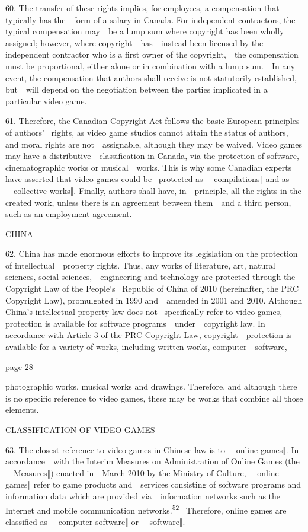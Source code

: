\documentclass[
]{article}
\begin{document}
{60. }{The transfer of these rights implies, for employees, a
compensation that typically has the~~form of a salary in Canada. For
independent contractors, the typical compensation may~~be a lump sum
where copyright has been wholly assigned; however, where
copyright~~has~~instead been licensed by the independent contractor who
is a first owner of the copyright,~~the compensation must be
proportional, either alone or in combination with a lump sum.~~In any
event, the compensation that authors shall receive is not statutorily
established, but~~will depend on the negotiation between the parties
implicated in a particular video game.}

{61. }{Therefore, the Canadian }{Copyright Act }{follows the basic
European princip}{les of authors' }{~rights, as video game studios
cannot attain the status of authors, and moral rights are
not~~assignable, although they may be waived. Video games may have a
distributive~~classification in Canada, via the protection of software,
cinematographic works or musical~~works. This is why some Canadian
experts have asserted that video games could be }{~protected as
―compilations‖ and as ―collective works‖}{. Finally, authors shall have,
in~~principle, all the rights in the created work, unless there is an
agreement between them~~and a third person, such as an employment
agreement.}

{CHINA}

{62. }{China has made enormous efforts to improve its legislation on the
protection of intellectual~~property rights. Thus, any works of
literature, art, natural sciences, social sciences,~~engineering and
technology are protected through the }{Copyright Law of the People`s
}{~Republic of China of 2010 }{(hereinafter, the PRC }{Copyright Law}{),
promulgated in 1990 and~~amended in 2001 and 2010. }{Although China's
intellectual property law does not }{~specifically refer to video games,
protection is available for software programs~~under~~copyright law. In
accordance with Article 3 of the PRC }{Copyright Law}{,
copyright~~protection is available for a variety of works, including
written works, computer~~software,}

{page 28}

{photographic works, musical works and drawings. Therefore, and although
there is no specific reference to video games, these may be works that
combine all those elements.}

{CLASSIFICATION OF VIDEO GAMES}

{63. }{The closest reference to video games in Chinese law is to ―online
games‖}{. In accordance~~with the }{Interim Measures on Administration
of Online Games }{(the ―}{Measures}{‖) enacted in~~March 2010 by the
Ministry of Culture, ―online games‖ refer to }{game products
and~~services consisting of software programs and information data which
are provided via~~information networks such as the Internet and mobile
communication networks.}\textsuperscript{{52 }}{~Therefore, online games
are classified as ―computer software‖ or ―software‖.}
\end{document}
